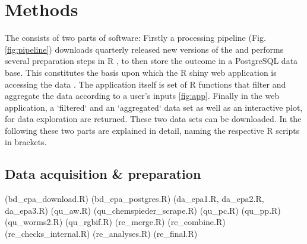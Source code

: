 
\section*{Methods}


The \etoxbase{} consists of two parts of software: Firstly a processing pipeline (Fig. \ref{fig:pipeline}) downloads quarterly released new versions of the \epa{} and performs several preparation steps in R \citep{r_core_team_r_2017}, to then store the outcome in a PostgreSQL data base. This constitutes the basis upon which the R shiny web application is accessing the data \citep{r_core_team_r_2017}. The application itself is set of R functions that filter and aggregate the data according to a user's inputs \ref{fig:app}. Finally in the web application, a `filtered` and an `aggregated` data set as well as an interactive plot, for data exploration are returned. These two data sets can be downloaded. In the following these two parts are explained in detail, naming the respective R scripts in brackets.

\subsection*{Data acquisition \& preparation}

(bd\_epa\_download.R) 
(bd\_epa\_postgres.R)
(da\_epa1.R, da\_epa2.R, da\_epa3.R)
(qu\_aw.R)
(qu\_chemspieder\_scrape.R) 
(qu\_pc.R) 
(qu\_pp.R)
(qu\_worms2.R) 
(qu\_rgbif.R) 
(re\_merge.R) 
(re\_combine.R)
(re\_checks\_internal.R) 
(re\_analyses.R)
(re\_final.R)

